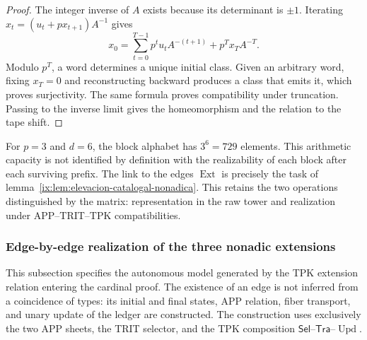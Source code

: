 \begin{proof}
The integer inverse of \(A\) exists because its determinant is \(\pm1\).
Iterating \(x_t=(u_t+px_{t+1})A^{-1}\) gives
\[
 x_0=\sum_{t=0}^{T-1}p^tu_tA^{-(t+1)}+p^Tx_TA^{-T}.
\]
Modulo \(p^T\), a word determines a unique initial class. Given an
arbitrary word, fixing \(x_T=0\) and reconstructing backward produces a
class that emits it, which proves surjectivity. The same formula
proves compatibility under truncation. Passing to the inverse limit gives the
homeomorphism and the relation to the tape shift.
\end{proof}

For \(p=3\) and \(d=6\), the block alphabet has \(3^6=729\)
elements. This arithmetic capacity is not identified by definition with
the realizability of each block after each surviving prefix. The
link to the edges \(\operatorname{Ext}\) is precisely the task
of lemma~\ref{ix:lem:elevacion-catalogal-nonadica}. This retains the two
operations distinguished by the matrix: representation in the raw tower and
realization under APP--TRIT--TPK compatibilities.




\subsubsection{Edge-by-edge realization of the three nonadic extensions}
\label{ix:subsubsec:tres-vueltas-ext-ch}

This subsection specifies the autonomous model generated by the TPK extension
relation entering the cardinal proof. The existence of an edge is not inferred
from a coincidence of types: its initial and final states, APP relation, fiber
transport, and unary update of the ledger are constructed. The construction
uses exclusively the two APP sheets, the TRIT selector, and the TPK
composition \(\mathsf{Sel}\)--\(\mathsf{Tra}\)--\(\operatorname{Upd}\).

